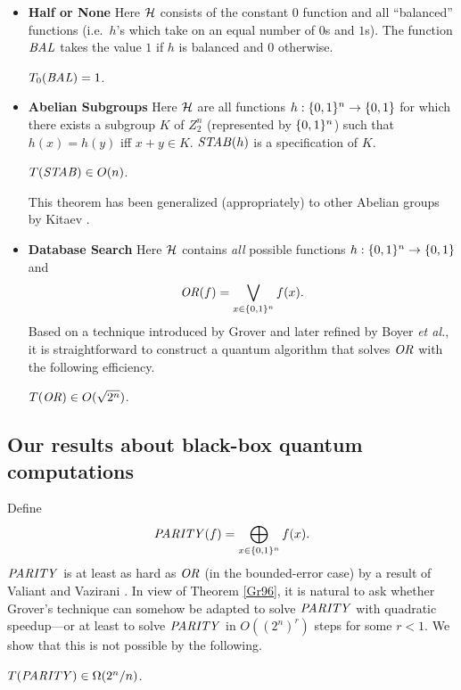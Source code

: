 \begin{itemize}

\item
{\bf Half or None} Here ${\cal H}$ consists of 
the constant $0$ function and all ``balanced'' functions
(i.e.\ $h$'s which take on an equal number of $0$s and $1$s).
The function $\mbox{\it BAL\/}$ takes the value $1$ if $h$ is balanced and $0$
otherwise.
\begin{theorem}\cite{DJ92}\label{DJ}
$T_0(\mbox{\it BAL\/}) = 1$.
\end{theorem}

\item
{\bf Abelian Subgroups} Here ${\cal H}$ are all functions 
$h : \01^n \rightarrow \01$ for which there exists a subgroup $K$ of $Z_2^n$ 
(represented by $\01^n$) such that $h(x) = h(y)$ iff $x+y \in K$.
$\mbox{\it STAB\/}(h)$ is a specification of $K$.
\begin{theorem}\cite{Si94}\label{Si94}
$T(\mbox{\it STAB\/}) \in O(n)$.
\end{theorem}
This theorem has been generalized (appropriately) to other Abelian 
groups by Kitaev \cite{Ki95}.

\item
{\bf Database Search}
Here ${\cal H}$ contains {\em all} possible functions $h : \01^n \rightarrow \01$ 
and 
$$\OR(f) = \bigvee_{x \in \01^n} f(x).$$
Based on a technique introduced by Grover and later refined by Boyer 
{\it et al.}, it is straightforward to construct a quantum 
algorithm that solves $\mbox{\it OR\/}$ with the following efficiency.
\begin{theorem}\cite{Gr96,BBHT96}\label{Gr96}
$T(\mbox{\it OR\/}) \in O(\sqrt{2^n})$.
\end{theorem}

\end{itemize}

\subsection{Our results about black-box quantum computations}

Define 
$$\PARITY(f) = \bigoplus_{x \in \01^n} f(x).$$
$\mbox{\it PARITY\/}$ is at least as hard as $\mbox{\it OR\/}$ (in the bounded-error 
case) by a result of Valiant and Vazirani \cite{VV86}.
In view of Theorem \ref{Gr96}, it is natural to ask whether 
Grover's technique can somehow be adapted to solve $\mbox{\it PARITY\/}$ with 
quadratic speedup---or at least to solve $\mbox{\it PARITY\/}$ in $O((2^n)^r)$ steps 
for some $r<1$.
We show that this is not possible by the following.

\begin{theorem}\label{parity}
$T(\mbox{\it PARITY\/}) \in \Omega(2^n/n)$.
\end{theorem}

